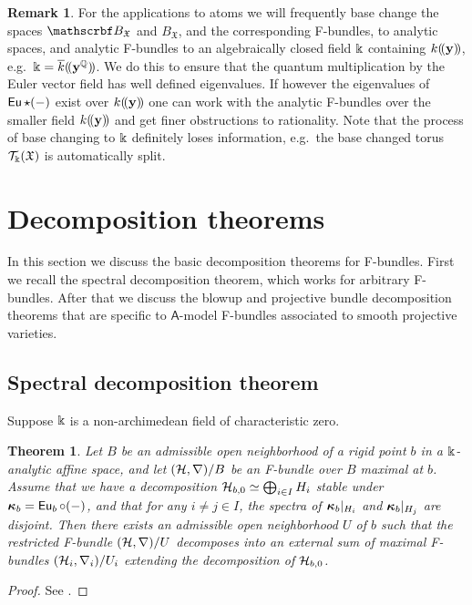 \documentclass[twoside,leqno]{article}
\numberwithin{equation}{section}
\theoremstyle{plain}
\newtheorem{theorem}[equation]{Theorem}
\theoremstyle{definition}
\newtheorem{remark}[equation]{Remark}
\begin{document}
\begin{remark} \label{rem:basechange} For the applications to atoms we will
frequently base change the spaces $\omB_{\mathfrak{X}}$ and
$B_{\mathfrak{X}}$, and the corresponding F-bundles, to analytic
spaces, and analytic F-bundles to an algebraically closed field $\Bbbk$
containing $k(\!(\mathbf{y})\!)$, e.g.\  $\Bbbk =
\overline{k}(\!(\mathbf{y}^{\mathbb Q})\!)$. We do this to ensure that the
quantum multiplication by the Euler vector field has well defined
eigenvalues. If however the eigenvalues of $\operatorname{\mathsf{Eu}}\star (-)$ exist over
$k(\!(\mathbf{y})\!)$ one can work with the analytic F-bundles over
the smaller field $k(\!(\mathbf{y})\!)$ and get finer obstructions to
rationality. Note that the process of base changing to $\Bbbk$
definitely loses information, e.g.\ the base changed torus
$\mathcal{T}_{\Bbbk}(\mathfrak{X})$ is automatically split.
\end{remark}







\section{Decomposition theorems} \label{sec:decompose}

In this section we discuss the basic decomposition theorems for F-bundles.
First we recall the spectral decomposition theorem, which works for arbitrary F-bundles. After that we discuss the blowup and projective bundle decomposition theorems that are specific to $\mathsf{A}$-model F-bundles associated to smooth projective varieties. 


\subsection{Spectral decomposition theorem} \label{ssec:specd} 


 Suppose $\Bbbk$ is a non-archimedean field of characteristic zero.

\begin{theorem} \label{thm:K-decomposition}
    Let $B$ be an admissible open neighborhood of a rigid point $b$ in a
    $\Bbbk$-analytic affine space, and let $(\mathcal H ,\nabla)/B$ be an
    F-bundle over $B$ maximal at $b$.  Assume that we have a
    decomposition $\mathcal H_{b,0} \simeq \bigoplus_{i\in I} H_i$ stable
    under $\boldsymbol{\kappa}_b = \operatorname{\mathsf{Eu}}_{b}\circ (-)$, and that for any $i\neq j\in
    I$, the spectra of $\boldsymbol{\kappa}_b\vert_{H_i}$ and $\boldsymbol{\kappa}_b\vert_{H_j}$
    are disjoint.  Then there exists an admissible open neighborhood
    $U$ of $b$ such that the restricted F-bundle $(\mathcal H,\nabla)/U$ decomposes
    into an external sum of maximal F-bundles $(\mathcal H_i ,\nabla_i ) /U_i$
    extending the decomposition of $\mathcal H_{b,0}$.
\end{theorem}
\begin{proof}
    See \cite[Theorem 1.2]{HYZZ_Decomposition}.
\end{proof}
\end{document}
